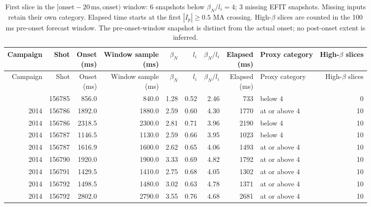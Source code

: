 \begingroup
\small
\setlength{\tabcolsep}{4pt}
\begin{longtable}{@{}rrrrrrrrlr@{}}
\caption{First slice in the $[\mathrm{onset}-20\,\mathrm{ms},\mathrm{onset})$ window: 6 snapshots below $\beta_N/l_i=4$; 3 missing EFIT snapshots. Missing inputs retain their own category. Elapsed time starts at the first $|I_p|\geq0.5$ MA crossing. High-$\beta$ slices are counted in the 100 ms pre-onset forecast window. The pre-onset-window snapshot is distinct from the actual onset; no post-onset extent is inferred.} \\
\toprule
Campaign & Shot & \shortstack{Onset\\(ms)} & \shortstack{Window sample\\(ms)} & $\beta_N$ & $l_i$ & $\beta_N/l_i$ & \shortstack{Elapsed\\(ms)} & Proxy category & \shortstack{High-$\beta$\\slices} \\
\midrule
\endfirsthead
\toprule
Campaign & Shot & \shortstack{Onset\\(ms)} & \shortstack{Window sample\\(ms)} & $\beta_N$ & $l_i$ & $\beta_N/l_i$ & \shortstack{Elapsed\\(ms)} & Proxy category & \shortstack{High-$\beta$\\slices} \\
\midrule
\endhead
\midrule
\endfoot
\bottomrule
\endlastfoot
2014 & 156785 & 856.0 & 840.0 & 1.28 & 0.52 & 2.46 & 733 & below 4 & 0 \\
2014 & 156786 & 1892.0 & 1880.0 & 2.59 & 0.60 & 4.30 & 1770 & at or above 4 & 10 \\
2014 & 156786 & 2318.5 & 2300.0 & 2.81 & 0.71 & 3.96 & 2190 & below 4 & 10 \\
2014 & 156787 & 1146.5 & 1130.0 & 2.59 & 0.66 & 3.95 & 1023 & below 4 & 10 \\
2014 & 156787 & 1616.9 & 1600.0 & 2.62 & 0.65 & 4.06 & 1493 & at or above 4 & 10 \\
2014 & 156790 & 1920.0 & 1900.0 & 3.33 & 0.69 & 4.82 & 1792 & at or above 4 & 10 \\
2014 & 156791 & 1429.5 & 1410.0 & 2.75 & 0.68 & 4.05 & 1302 & at or above 4 & 10 \\
2014 & 156792 & 1498.5 & 1480.0 & 3.02 & 0.63 & 4.78 & 1371 & at or above 4 & 10 \\
2014 & 156792 & 2802.0 & 2790.0 & 3.55 & 0.76 & 4.68 & 2681 & at or above 4 & 10 \\

\end{longtable}
